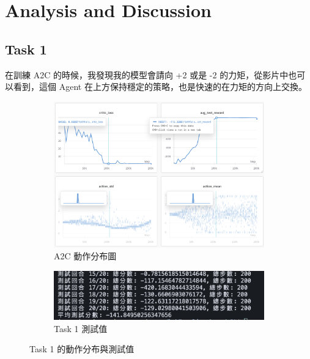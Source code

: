 \clearpage
\section{Analysis and Discussion}


\subsection{Task 1}

在訓練 A2C 的時候，我發現我的模型會請向 +2 或是 -2 的力矩，從影片中也可以看到，這個 Agent 在上方保持穩定的策略，也是快速的在力矩的方向上交換。

\begin{figure}[h]
    \centering
    \begin{subfigure}[b]{0.8\textwidth}
        \centering
        \includegraphics[width=\textwidth]{figures/A2C_action_dist.png}
        \caption{A2C 動作分布圖}
        \label{fig:a2c_action_dist}
    \end{subfigure}
    \vspace{0.5cm}
    \begin{subfigure}[b]{0.8\textwidth}
        \centering
        \includegraphics[width=\textwidth]{figures/task1_test_value.png}
        \caption{Task 1 測試值}
        \label{fig:task1_test_value}
    \end{subfigure}
    \caption{Task 1 的動作分布與測試值}
    \label{fig:task1_combined}
\end{figure}

